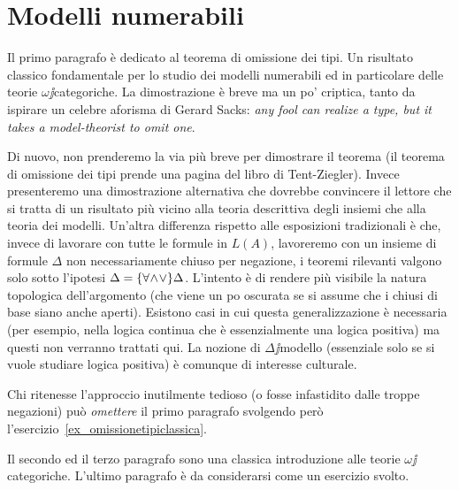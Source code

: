 \chapter{Modelli numerabili}\label{numerabili}


\def\ceq#1#2#3{\parbox{15ex}{$\displaystyle #1$}\parbox{6ex}{\hfil$\displaystyle #2$}$\displaystyle  #3$}


Il primo paragrafo \`e dedicato al teorema di omissione dei tipi. Un risultato classico fondamentale per lo studio dei modelli numerabili ed in particolare delle teorie $\omega\jj$categoriche. La dimostrazione \`e breve ma un po' criptica, tanto da ispirare un celebre aforisma di Gerard Sacks: \textit{any fool can realize a type, but it takes a model-theorist to omit one}.

Di nuovo, non prenderemo la via pi\`u breve per dimostrare il teorema (il teorema di omissione dei tipi prende una pagina del libro di Tent-Ziegler). Invece presenteremo una dimostrazione alternativa che dovrebbe convincere il lettore che si tratta di un risultato pi\`u vicino alla teoria descrittiva degli insiemi che alla teoria dei modelli. Un'altra differenza rispetto alle esposizioni tradizionali \`e che, invece di lavorare con tutte le formule in $L(A)$, lavoreremo con un insieme di formule $\Delta$ non necessariamente chiuso per negazione, i teoremi rilevanti valgono solo sotto l'ipotesi $\Delta=\{\forall\!\wedge\!\vee\}\Delta$. L'intento \`e di rendere pi\`u visibile la natura topologica dell'argomento (che viene un po oscurata se si assume che i chiusi di base siano anche aperti). Esistono casi in cui questa generalizzazione \`e necessaria (per esempio, nella logica continua che \`e essenzialmente una logica positiva) ma questi non verranno trattati qui. La nozione di $\Delta\jj$modello (essenziale solo se si vuole studiare logica positiva) \`e comunque di interesse culturale.

Chi ritenesse l'approccio inutilmente tedioso (o fosse infastidito dalle troppe negazioni) pu\`o \textit{omettere\/} il primo paragrafo svolgendo per\`o l'esercizio~\ref{ex_omissionetipiclassica}. 

Il secondo ed il terzo paragrafo sono una classica introduzione alle teorie $\omega\jj$categoriche. L'ultimo paragrafo \`e da considerarsi come un esercizio svolto. 



